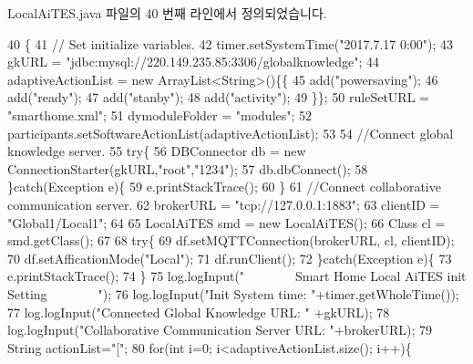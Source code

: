 Local\+Ai\+T\+E\+S.\+java 파일의 40 번째 라인에서 정의되었습니다.


\begin{DoxyCode}
40                           \{
41         \textcolor{comment}{// Set initialize variables.}
42         timer.setSystemTime(\textcolor{stringliteral}{"2017.7.17 0:00"});
43         gkURL = \textcolor{stringliteral}{"jdbc:mysql://220.149.235.85:3306/globalknowledge"};
44         adaptiveActionList = \textcolor{keyword}{new} ArrayList<String>()\{\{
45             add(\textcolor{stringliteral}{"powersaving"});
46             add(\textcolor{stringliteral}{"ready"});
47             add(\textcolor{stringliteral}{"stanby"});
48             add(\textcolor{stringliteral}{"activity"});    
49         \}\};
50         ruleSetURL = \textcolor{stringliteral}{"smarthome.xml"};
51         dymoduleFolder = \textcolor{stringliteral}{"modules"};
52         participants.setSoftwareActionList(adaptiveActionList);
53         
54         \textcolor{comment}{//Connect global knowledge server.}
55         \textcolor{keywordflow}{try}\{
56             DBConnector db = \textcolor{keyword}{new} ConnectionStarter(gkURL,\textcolor{stringliteral}{"root"},\textcolor{stringliteral}{"1234"});
57             db.dbConnect();
58         \}\textcolor{keywordflow}{catch}(Exception e)\{
59             e.printStackTrace();
60         \}
61         \textcolor{comment}{//Connect collaborative communication server.}
62         brokerURL = \textcolor{stringliteral}{"tcp://127.0.0.1:1883"};
63         clientID = \textcolor{stringliteral}{"Global1/Local1"};
64         
65         LocalAiTES smd = \textcolor{keyword}{new} LocalAiTES();
66         Class cl = smd.getClass();
67         
68         \textcolor{keywordflow}{try}\{
69             df.setMQTTConnection(brokerURL, cl, clientID);
70             df.setAfficationMode(\textcolor{stringliteral}{"Local"});
71             df.runClient();
72         \}\textcolor{keywordflow}{catch}(Exception e)\{
73             e.printStackTrace();
74         \}
75         log.logInput(\textcolor{stringliteral}{"~~~~~~~~Smart Home Local AiTES init Setting~~~~~~~~"});
76         log.logInput(\textcolor{stringliteral}{"Init System time: "}+timer.getWholeTime());
77         log.logInput(\textcolor{stringliteral}{"Connected Global Knowledge URL: "} +gkURL);
78         log.logInput(\textcolor{stringliteral}{"Collaborative Communication Server URL: "}+brokerURL);
79         String actionList=\textcolor{stringliteral}{"["};
80         \textcolor{keywordflow}{for}(\textcolor{keywordtype}{int} i=0; i<adaptiveActionList.size(); i++)\{

\end{DoxyCode}
